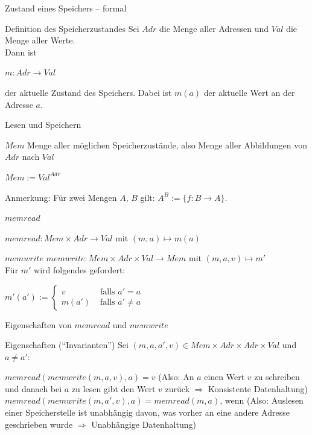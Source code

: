 \documentclass[handout]{beamer}
\begin{document}
\begin{frame}{Zustand eines Speichers -- formal}
	\p\begin{block}{Definition des Speicherzustandes}
		Sei $Adr$ die Menge aller Adressen und $Val$ die Menge aller Werte.\\
		Dann ist \\ \begin{center}
			$m: Adr \rightarrow Val$
		\end{center}
		der aktuelle Zustand des Speichers. Dabei ist $m(a)$ der aktuelle Wert an der Adresse $a$.
	\end{block}
\end{frame}


\begin{frame}{Lesen und Speichern}
	\pause
	\begin{block}{$Mem$}
		Menge aller möglichen Speicherzustände, also Menge aller Abbildungen von $Adr$ nach $Val$
		\begin{center}
			$Mem:= Val^{Adr}$
		\end{center}
	\end{block}
	\p Anmerkung: \p Für zwei Mengen $A$, $B$ gilt\p : $A^B := \{f: B \rightarrow A\}$.\p
	\begin{block}{$memread$}
		\begin{center}
			$memread: Mem \times Adr \rightarrow Val \text{ mit } (m, a) \mapsto m(a)$
		\end{center}
	\end{block}
	\pause
	\begin{block}{$memwrite$}
		$memwrite: Mem \times Adr \times Val \rightarrow Mem \text{ mit } (m, a,v) \mapsto m'$\\
		Für $m'$ wird folgendes gefordert:
		\begin{center}
			$m'(a') :=\begin{cases} 
			v& \text{ falls } a' = a\\
			m(a') &\text{ falls } a' \neq a
			\end{cases} $ 
		\end{center}
	\end{block}
\end{frame}

\begin{frame}{Eigenschaften von $memread$ und $memwrite$}
	
	\begin{block}{Eigenschaften (``Invarianten'')}
        Sei $(m, a, a', v) \in Mem \times Adr \times Adr \times Val$ und $a \neq a'$:
		\begin{itemize}
			\pitem $memread(memwrite(m,a,v),a) = v$ \p (Also: An $a$ einen Wert $v$ zu schreiben und danach bei $a$ zu lesen gibt den Wert $v$ zurück \p $\Rightarrow$ Konsistente Datenhaltung)
			\pitem $memread(memwrite(m, a', v),a) = memread(m,a)$, wenn \p (Also: Auslesen einer Speicherstelle ist unabhängig davon, was vorher an eine andere Adresse geschrieben wurde \p $\Rightarrow$ Unabhängige Datenhaltung)
		\end{itemize}
	\end{block}

\end{frame}
\end{document}
